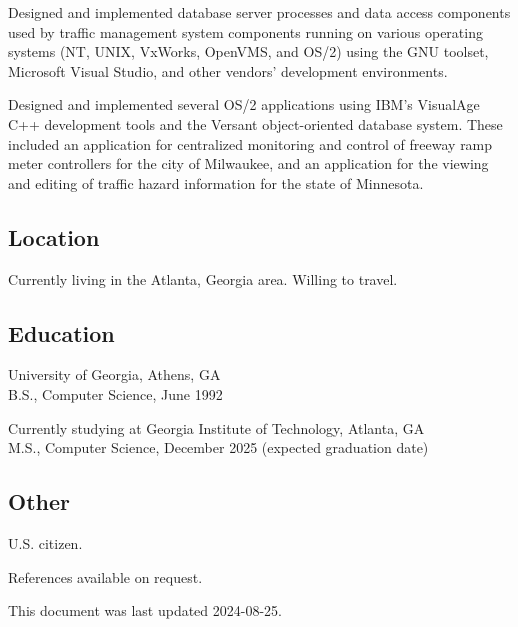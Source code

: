 Designed and implemented database server processes and data access
components used by traffic management system components running on
various operating systems (NT, UNIX, VxWorks, OpenVMS, and OS/2) using
the GNU toolset, Microsoft Visual Studio, and other vendors' development
environments.

Designed and implemented several OS/2 applications using IBM's VisualAge
C++ development tools and the Versant object-oriented database system.
These included an application for centralized monitoring and control of
freeway ramp meter controllers for the city of Milwaukee, and an
application for the viewing and editing of traffic hazard information
for the state of Minnesota.

\subsection{Location}\label{location}

Currently living in the Atlanta, Georgia area. Willing to travel.

\subsection{Education}\label{education}

University of Georgia, Athens, GA\\
B.S., Computer Science, June 1992

Currently studying at Georgia Institute of Technology, Atlanta, GA\\
M.S., Computer Science, December 2025 (expected graduation date)

\subsection{Other}\label{other}

U.S. citizen.

References available on request.

This document was last updated 2024-08-25.
